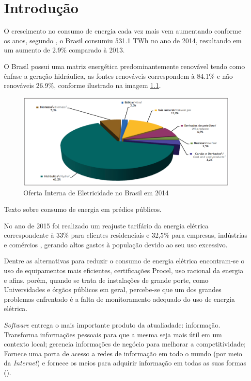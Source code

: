 \chapter{Introdução}
O crescimento no consumo de energia cada vez mais vem aumentando conforme os anos, segundo \cite{balanco_energetico}, o
Brasil consumiu 531.1 TWh no ano de 2014, resultando em um aumento de 2.9\% comparado à 2013.

O Brasil possui uma matriz energética predominantemente renovável tendo como ênfase a geração hidráulica, as fontes renováveis correspondem à 84.1\% e não renováveis 26.9\%, conforme ilustrado na imagem \ref{consumo-2014}.

\begin{figure}[h]
    \centering
    \includegraphics[keepaspectratio=true,scale=0.4]{figuras/consumo_energia_2014.eps}
    \caption{Oferta Interna de Eletricidade no Brasil em 2014}
    \label{consumo-2014}
\end{figure}

Texto sobre consumo de energia em prédios públicos.

No ano de 2015 foi realizado um reajuste tarifário da energia elétrica correspondente à 33\% para clientes residenciais e 32,5\% para empresas, indústrias e comércios
\cite{aumento_energia}, gerando altos gastos à população devido ao seu uso excessivo.

Dentre as alternativas para reduzir o consumo de energia elétrica encontram-se o uso de equipamentos mais eficientes, certificações Procel, uso racional da energia e afins, porém, quando se trata de instalações de grande porte, como Universidades e órgãos públicos em geral, percebe-se que um dos grandes problemas enfrentado é a falta de monitoramento adequado do uso de energia elétrica.

\textit{Software} entrega o mais importante produto da atualiadade: informação. Transforma informações
pessoais para que a mesma seja mais útil em um contexto local; gerencia informações de negócio para
melhorar a competitividade; Fornece uma porta de acesso a redes de informação em todo o mundo (por
meio da \textit{Internet}) e fornece os meios para adquirir informação em todas as suas formas (\cite{pressman_2009}).

